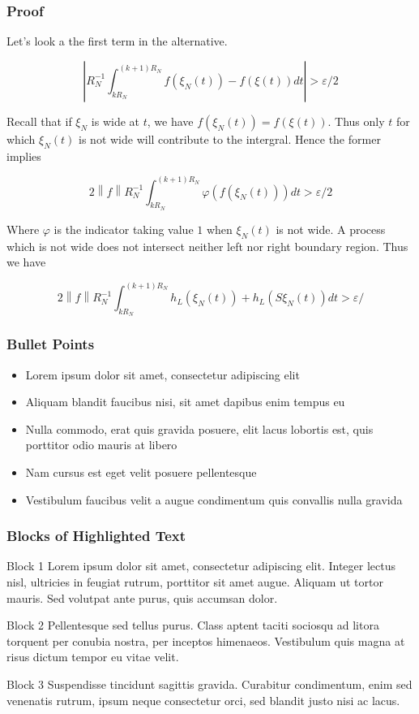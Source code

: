 \documentclass{beamer}
\newcommand{\norm}[1]{{\left\lVert#1\right\rVert}}
\begin{document}
\begin{frame}
    \frametitle{Proof}
    Let's look a the first term in the alternative.

    \[
        \left|R_N^{-1}\int_{kR_N}^{(k+1)R_N}f(\xi_N(t)) - f(\xi(t))dt \right| > \varepsilon/2 
    \]

    Recall that if $\xi_N$ is wide at $t$, we have $f(\xi_N(t)) = f(\xi(t))$. Thus only $t$ for which $\xi_N(t)$ is not wide will contribute to the intergral. Hence the former implies

    \[
        2\norm{f}R_N^{-1}\int_{kR_N}^{(k+1)R_N}\varphi(f(\xi_N(t)))dt > \varepsilon/2
    \]
    
    Where $\varphi$ is the indicator taking value $1$ when $\xi_N(t)$ is not wide. A process which is not wide does not intersect neither left nor right boundary region. Thus we have

    \[
        2\norm{f}R_N^{-1}\int_{kR_N}^{(k+1)R_N}h_L(\xi_N(t)) + h_L(S\xi_N(t))dt > \varepsilon/
    \]
\end{frame}



\begin{frame}
\frametitle{Bullet Points}
\begin{itemize}
\item Lorem ipsum dolor sit amet, consectetur adipiscing elit
\item Aliquam blandit faucibus nisi, sit amet dapibus enim tempus eu
\item Nulla commodo, erat quis gravida posuere, elit lacus lobortis est, quis porttitor odio mauris at libero
\item Nam cursus est eget velit posuere pellentesque
\item Vestibulum faucibus velit a augue condimentum quis convallis nulla gravida
\end{itemize}
\end{frame}


\begin{frame}
\frametitle{Blocks of Highlighted Text}
\begin{block}{Block 1}
Lorem ipsum dolor sit amet, consectetur adipiscing elit. Integer lectus nisl, ultricies in feugiat rutrum, porttitor sit amet augue. Aliquam ut tortor mauris. Sed volutpat ante purus, quis accumsan dolor.
\end{block}

\begin{block}{Block 2}
Pellentesque sed tellus purus. Class aptent taciti sociosqu ad litora torquent per conubia nostra, per inceptos himenaeos. Vestibulum quis magna at risus dictum tempor eu vitae velit.
\end{block}

\begin{block}{Block 3}
Suspendisse tincidunt sagittis gravida. Curabitur condimentum, enim sed venenatis rutrum, ipsum neque consectetur orci, sed blandit justo nisi ac lacus.
\end{block}
\end{frame}
\end{document}
